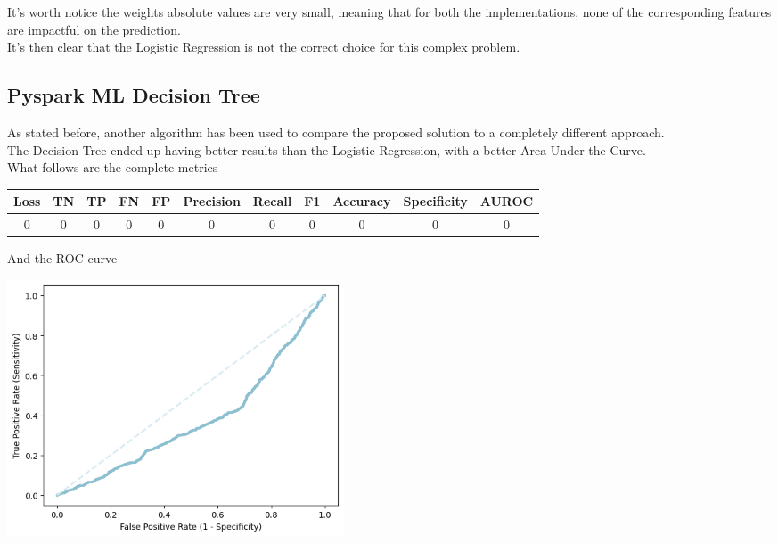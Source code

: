 \documentclass[
	letterpaper, %
	10pt, %
]{class}
\begin{document}
It's worth notice the weights absolute values are very small, meaning that for both the implementations, none of the corresponding features are impactful on the prediction.\\
It's then clear that the Logistic Regression is not the correct choice for this complex problem.

\subsection{Pyspark ML Decision Tree}

As stated before, another algorithm has been used to compare the proposed solution to a completely different approach.\\
The Decision Tree ended up having better results than the Logistic Regression, with a better Area Under the Curve.\\
What follows are the complete metrics

\begin{center}
    \begin{tabular}{ |c|c|c|c|c|c|c|c|c|c|c| }
        \hline
        Loss & TN & TP & FN & FP & Precision & Recall & F1 & Accuracy & Specificity & AUROC \\
        \hline
        0    & 0  & 0  & 0  & 0  & 0         & 0      & 0  & 0        & 0           & 0     \\
        \hline
    \end{tabular}
\end{center}

And the ROC curve

\begin{center}
    \includegraphics[width=10cm]{../images/tree_roc.png}
\end{center}
\end{document}
